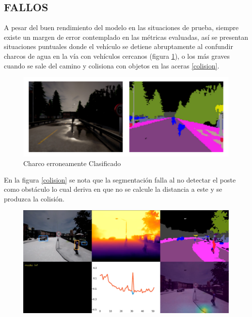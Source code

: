 \subsection{FALLOS}
A pesar del buen rendimiento del modelo en las situaciones de prueba, siempre existe un margen de error contemplado en las métricas evaluadas, así se presentan situaciones puntuales donde el vehículo se detiene abruptamente al confundir charcos de agua en la vía con vehículos cercanos (figura \ref{charco}), o los más graves cuando se sale del camino y colisiona con objetos en las aceras \ref{colision}.

\begin{figure}[H]
	\centering
	\includegraphics[scale=0.7]{imagenes/preds/err1}
	\caption[Charco erroneamente Clasificado]{Charco erroneamente Clasificado}
	\label{charco}
\end{figure}


En la figura \ref{colision} se nota que la segmentación falla al no detectar el poste como obstáculo lo cual deriva en que no se calcule la distancia a este y se produzca la colisión.

\begin{figure}[H]
	\centering
	\includegraphics[scale=0.22]{imagenes/preds/crash1}
\end{figure}

